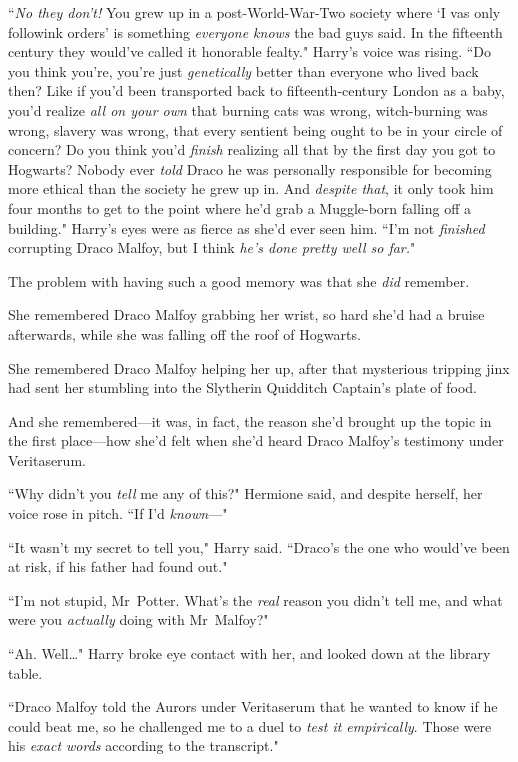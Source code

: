 ``\emph{No they don't!} You grew up in a post-World-War-Two society where `I vas only followink orders' is something \emph{everyone knows} the bad guys said. In the fifteenth century they would've called it honorable fealty." Harry's voice was rising. ``Do you think you're, you're just \emph{genetically} better than everyone who lived back then? Like if you'd been transported back to fifteenth-century London as a baby, you'd realize \emph{all on your own} that burning cats was wrong, witch-burning was wrong, slavery was wrong, that every sentient being ought to be in your circle of concern? Do you think you'd \emph{finish} realizing all that by the first day you got to Hogwarts? Nobody ever \emph{told} Draco he was personally responsible for becoming more ethical than the society he grew up in. And \emph{despite that}, it only took him four months to get to the point where he'd grab a Muggle-born falling off a building." Harry's eyes were as fierce as she'd ever seen him. ``I'm not \emph{finished} corrupting Draco Malfoy, but I think \emph{he's done pretty well so far.}"

The problem with having such a good memory was that she \emph{did} remember.

She remembered Draco Malfoy grabbing her wrist, so hard she'd had a bruise afterwards, while she was falling off the roof of Hogwarts.

She remembered Draco Malfoy helping her up, after that mysterious tripping jinx had sent her stumbling into the Slytherin Quidditch Captain's plate of food.

And she remembered—it was, in fact, the reason she'd brought up the topic in the first place—how she'd felt when she'd heard Draco Malfoy's testimony under Veritaserum.

``Why didn't you \emph{tell} me any of this?" Hermione said, and despite herself, her voice rose in pitch. ``If I'd \emph{known}—"

``It wasn't my secret to tell you," Harry said. ``Draco's the one who would've been at risk, if his father had found out."

``I'm not stupid, Mr~Potter. What's the \emph{real} reason you didn't tell me, and what were you \emph{actually} doing with Mr~Malfoy?"

``Ah. Well{\ldots}" Harry broke eye contact with her, and looked down at the library table.

``Draco Malfoy told the Aurors under Veritaserum that he wanted to know if he could beat me, so he challenged me to a duel to \emph{test it empirically}. Those were his \emph{exact words} according to the transcript."

